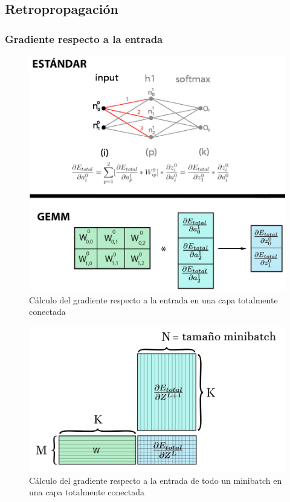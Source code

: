 \subsection{Retropropagación}

\subsubsection{Gradiente respecto a la entrada}
\begin{figure}[H]
	\centering
	\includegraphics[scale=0.25]{imagenes/gemm_fully_back_input.jpg}  
	\caption{Cálculo del gradiente respecto a la entrada en una capa totalmente conectada}
	\label{fig:gemm_fully_back_input}
\end{figure}


\begin{figure}[H]
	\centering
	\includegraphics[scale=0.25]{imagenes/gemm_fully_back_input_minibatch.jpg}  
	\caption{Cálculo del gradiente respecto a la entrada de todo un minibatch en una capa totalmente conectada}
	\label{fig:gemm_fully_back_input_minibatch}
\end{figure}

